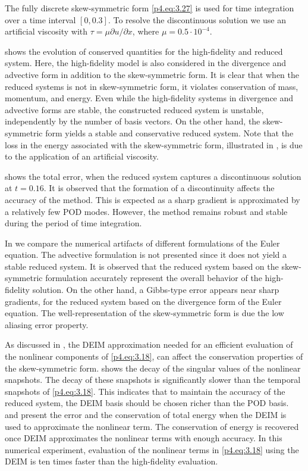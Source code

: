 The fully discrete skew-symmetric form \eqref{p4.eq:3.27} is used for time integration over a time interval $[0,0.3]$. To resolve the discontinuous solution we use an artificial viscosity with $\tau = \mu \partial u / \partial x$, where $\mu = 0.5 \cdot 10^{-4}$.

 shows the evolution of conserved quantities for the high-fidelity and reduced system. Here, the high-fidelity model is also considered in the divergence and advective form in addition to the skew-symmetric form. It is clear that when the reduced systems is not in skew-symmetric form, it violates conservation of mass, momentum, and energy. Even while the high-fidelity systems in divergence and advective forms are stable, the constructed reduced system is unstable, independently by the number of basis vectors. On the other hand, the skew-symmetric form yields a stable and conservative reduced system. Note that the loss in the energy associated with the skew-symmetric form, illustrated in , is due to the application of an artificial viscosity. 

 shows the total error, when the reduced system captures a discontinuous solution at $t=0.16$. It is observed that the formation of a discontinuity affects the accuracy of the method. This is expected as a sharp gradient is approximated by a relatively few POD modes. However, the method remains robust and stable during the period of time integration.

In  we compare the numerical artifacts of different formulations of the Euler equation. The advective formulation is not presented since it does not yield a stable reduced system. It is observed that the reduced system based on the skew-symmetric formulation accurately represent the overall behavior of the high-fidelity solution. On the other hand, a Gibbs-type error \cite{thompson1992fourier} appears near sharp gradients, for the reduced system based on the divergence form of the Euler equation. The well-representation of the skew-symmetric form is due the low aliasing error property. 

As discussed in , the DEIM approximation needed for an efficient evaluation of the nonlinear components of \eqref{p4.eq:3.18}, can affect the conservation properties of the skew-symmetric form.  shows the decay of the singular values of the nonlinear snapshots. The decay of these snapshots is significantly slower than the temporal snapshots of \eqref{p4.eq:3.18}. This indicates that to maintain the accuracy of the reduced system, the DEIM basis should be chosen richer than the POD basis.  and  present the error and the conservation of total energy when the DEIM is used to approximate the nonlinear term. The conservation of energy is recovered once DEIM approximates the nonlinear terms with enough accuracy. 
In this numerical experiment, evaluation of the nonlinear terms in \eqref{p4.eq:3.18} using the DEIM is ten times faster than the high-fidelity evaluation.

